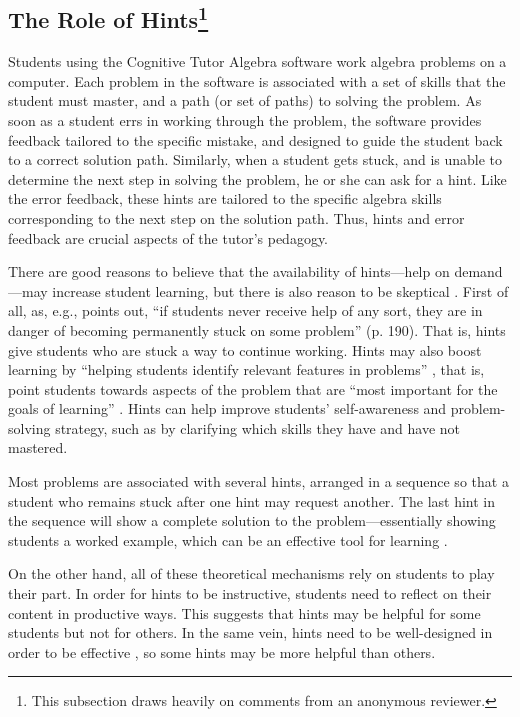 \documentclass{article}\usepackage[]{graphicx}\usepackage[]{color}
\begin{document}
\subsection{The Role of Hints\footnote{This subsection draws heavily
  on comments from an anonymous reviewer.}}
Students using the Cognitive Tutor Algebra software work algebra
problems on a computer.
Each problem in the software is associated with a set of skills that
the student must master, and a path (or set of paths) to solving the
problem.
As soon as a student errs in working through the problem, the
software provides feedback tailored to the specific mistake, and
designed to guide the student back to a correct solution path.
Similarly, when a student gets stuck, and is unable to determine the
next step in solving the problem, he or she can ask for a hint.
Like the error feedback, these hints are tailored to the specific
algebra skills corresponding to the next step on the solution path.
Thus, hints and error feedback are crucial aspects of the tutor's
pedagogy.

There are good reasons to believe that the availability of
hints---help on demand---may increase student learning, but there is
also reason to be skeptical \cite[See][for an overview of the theory]{aleven2016help}.
First of all, as, e.g., \citet{anderson1995cognitive} points out, ``if
students never receive help of any sort, they are in danger of becoming
permanently stuck on some problem'' (p. 190).
That is, hints give students who are stuck a way to continue working.
Hints may also boost learning by ``helping students identify relevant features in
problems'' \citep[][p. 6]{aleven2016help},  that is, point students
towards aspects of the problem that are ``most important for the goals
of learning'' \citep[][p. 782]{koedinger2012knowledge}.
Hints can help improve students' self-awareness and
problem-solving strategy, such as by clarifying which skills they have
and have not mastered.

Most problems are associated with several hints, arranged in a
sequence so that a student who remains stuck after one hint may
request another.
The last hint in the sequence will show a complete solution to the
problem---essentially showing students a worked example, which can be an
effective tool for learning \citep[e.g.][]{sweller1985use}.

On the other hand, all of these theoretical mechanisms rely on
students to play their part.
In order for hints to be instructive, students need to reflect on
their content in productive ways.
This suggests that hints may be helpful for some students but not for
others.
In the same vein, hints need to be well-designed in order to be
effective \citep{mckendree1990effective}, so some hints may be more
helpful than others.
\end{document}

